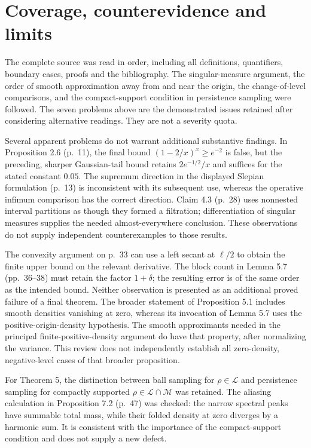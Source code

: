 \documentclass[10pt]{article}
\begin{document}
\section*{Coverage, counterevidence and limits}
The complete source was read in order, including all definitions, quantifiers, boundary cases, proofs and the bibliography. The singular-measure argument, the order of smooth approximation away from and near the origin, the change-of-level comparisons, and the compact-support condition in persistence sampling were followed. The seven problems above are the demonstrated issues retained after considering alternative readings. They are not a severity quota.\par
Several apparent problems do not warrant additional substantive findings. In Proposition 2.6 (p. 11), the final bound \((1-2/x)^x\ge e^{-2}\) is false, but the preceding, sharper Gaussian-tail bound retains \(2e^{-1/2}/x\) and suffices for the stated constant \(0.05\). The supremum direction in the displayed Slepian formulation (p. 13) is inconsistent with its subsequent use, whereas the operative infimum comparison has the correct direction. Claim 4.3 (p. 28) uses nonnested interval partitions as though they formed a filtration; differentiation of singular measures supplies the needed almost-everywhere conclusion. These observations do not supply independent counterexamples to those results.\par
The convexity argument on p. 33 can use a left secant at \(\ell/2\) to obtain the finite upper bound on the relevant derivative. The block count in Lemma 5.7 (pp. 36–38) must retain the factor \(1+\delta\); the resulting error is of the same order as the intended bound. Neither observation is presented as an additional proved failure of a final theorem. The broader statement of Proposition 5.1 includes smooth densities vanishing at zero, whereas its invocation of Lemma 5.7 uses the positive-origin-density hypothesis. The smooth approximants needed in the principal finite-positive-density argument do have that property, after normalizing the variance. This review does not independently establish all zero-density, negative-level cases of that broader proposition.\par
For Theorem 5, the distinction between ball sampling for \(\rho\in\mathcal L\) and persistence sampling for compactly supported \(\rho\in\mathcal L\cap\mathcal M\) was retained. The aliasing calculation in Proposition 7.2 (p. 47) was checked: the narrow spectral peaks have summable total mass, while their folded density at zero diverges by a harmonic sum. It is consistent with the importance of the compact-support condition and does not supply a new defect.\par
\end{document}
